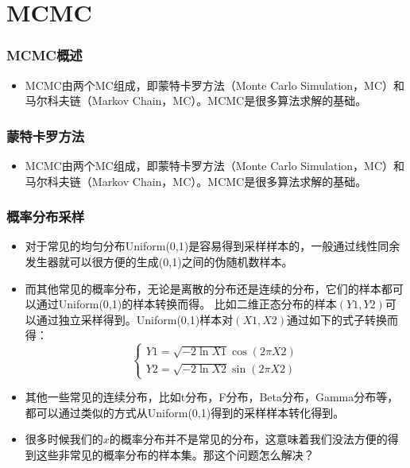 \section{MCMC}
\begin{frame}
  \frametitle{MCMC概述}
  \begin{itemize}
    \item MCMC由两个MC组成，即蒙特卡罗方法（Monte Carlo Simulation，MC）和马尔科夫链（Markov Chain，MC）。MCMC是很多算法求解的基础。
  \end{itemize}
\end{frame}

\begin{frame}
  \frametitle{蒙特卡罗方法}
  \begin{itemize}
    \item MCMC由两个MC组成，即蒙特卡罗方法（Monte Carlo Simulation，MC）和马尔科夫链（Markov Chain，MC）。MCMC是很多算法求解的基础。
  \end{itemize}
\end{frame}

\begin{frame}
  \frametitle{概率分布采样}
  \begin{itemize}
    \item 对于常见的均匀分布Uniform(0,1)是容易得到采样样本的，一般通过线性同余发生器就可以很方便的生成(0,1)之间的伪随机数样本。
    \item 而其他常见的概率分布，无论是离散的分布还是连续的分布，它们的样本都可以通过Uniform(0,1)的样本转换而得。
          比如二维正态分布的样本$(Y1, Y2)$可以通过独立采样得到。Uniform(0,1)样本对$(X1, X2)$通过如下的式子转换而得：
          \begin{equation}
            \begin{cases}
              Y1 = \sqrt{-2\ln{X1}} \cos{(2\pi X2)} \\
              Y2 = \sqrt{-2\ln{X2}} \sin{(2\pi X2)}
            \end{cases}
          \end{equation}
    \item 其他一些常见的连续分布，比如t分布，F分布，Beta分布，Gamma分布等，都可以通过类似的方式从Uniform(0,1)得到的采样样本转化得到。
    \item 很多时候我们的$x$的概率分布并不是常见的分布，这意味着我们没法方便的得到这些非常见的概率分布的样本集。那这个问题怎么解决？
  \end{itemize}
\end{frame}

